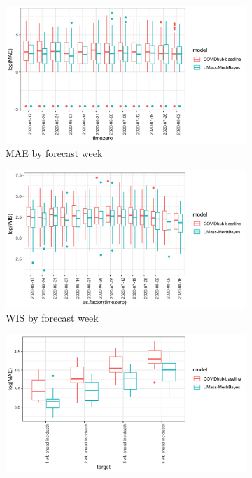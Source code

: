 \documentclass[11pt]{amsart}
\begin{document}
\begin{figure}
  \centering
     \begin{subfigure}{.5\textwidth}
  \centering
    \includegraphics[scale=.135]{mae_results_by_time_zero_inc.png}
    \caption{MAE by forecast week}
\end{subfigure}%
\begin{subfigure}{.5\textwidth}
  \centering
    \includegraphics[scale=.135]{wis_results_by_time_zero_inc.png}
    \caption{WIS by forecast week}
\end{subfigure}
\begin{subfigure}{.5\textwidth}
  \centering
    \includegraphics[scale=.135]{mae_results_by_target_inc.png}

\end{subfigure}
\end{figure}
\end{document}
